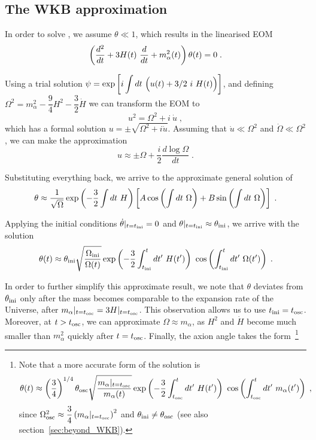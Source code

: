 \documentclass[11pt,a4paper]{article}
\begin{document}
\subsection{The WKB approximation}
%
In order to solve , we assume $\theta \ll 1$, which results in the linearised EOM
%
\begin{equation}
	\left( \dfrac{d^2}{d t} + 3 H(t) \ \dfrac{d}{d t} + m_{\alpha}^2(t)  \right) \theta(t) = 0 \; .
	\label{eq:linear_eom}
\end{equation}

Using a trial solution $\psi = \exp\left[  i \displaystyle \int d t \ \Big( u(t) +3/2 \ i \ H(t) \Big)  \right]$, and defining $\Omega^2 = m_{\alpha}^2 - \dfrac{9}{4} H^2 -  \dfrac{3}{2} \dot H $ we can transform the EOM to 
%
\begin{equation}
	u^2 = \Omega^2 + i \ \dot u \; ,
	\label{eq:eom_of_u}
\end{equation}
%
which has a formal solution $u = \pm \sqrt{\Omega^2 + i \dot u}$. Assuming that $\dot u \ll \Omega^2$ and $\dot \Omega \ll \Omega^2$, we can make the approximation
%
\begin{equation}
	u \approx \pm \Omega + \dfrac{i}{2} \dfrac{d \log \Omega}{d t} \;.
	\label{eq:u_approx}
\end{equation}


Substituting everything back, we arrive to the approximate general solution of  
%
\begin{equation}
	\theta \approx \dfrac{1}{\sqrt{\Omega}} \exp\left( -\dfrac{3}{2} \int d t \ H \right) \left[  A \cos\left(  \int d t \ \Omega \right) +  B \sin\left(  \int d t \ \Omega \right)     \right] \;. 
	\label{eq:general_solution_eom_approx}
\end{equation}

Applying the initial conditions $ \dot \theta |_{t=t_{\rm ini}{}} = 0$ and  $\theta|_{t=t_{\rm ini}{}} \approx \theta_{\rm ini}{}$, we arrive with the solution 
%
\begin{equation}
	\theta(t) \approx \theta_{\rm ini}{} \sqrt{ \dfrac{ \Omega_{\rm ini} }{\Omega (t)} } \exp\left( -\dfrac{3}{2} \int_{t_{\rm ini}{}}^t d t^\prime  \ H(t^\prime) \right) \  \cos\left(  \int_{t_{\rm ini}{}}^t d t^\prime  \ \Omega(t^\prime) \right)   \;.
	\label{eq:solution_eom_approx} 
\end{equation}


In order to further simplify this approximate result, we note that $\theta$ deviates from $\theta_{\rm ini}{}$ only after the mass becomes comparable to the expansion rate of the Universe, \ie after $m_{\alpha}|_{t = t_{\rm osc}{}} = 3 H|_{t = t_{\rm osc}{}}$. This observation allows us to use $t_{\rm ini}{} = t_{\rm osc}{}$.  Moreover, at $t> t_{\rm osc}{}$, we can approximate $\Omega \approx m_{\alpha}$, as $H^2$ and $\dot H$ become much smaller than $m_\alpha^2$ quickly after $t=t_{\rm osc}{}$. Finally, the axion angle takes the form~\footnote{Note that a more accurate form of the solution is 
	$$\theta(t) \approx \left( \dfrac{3}{4} \right)^{1/4} \theta_{\rm osc} \sqrt{ \dfrac{  m_\alpha{}|_{t=t_{\rm osc}{}}  }{m_\alpha{}  (t)} } \exp\left( -\dfrac{3}{2} \int_{t_{\rm osc}{}}^t d t^\prime  \ H(t^\prime) \right) \  \cos\left(  \int_{t_{\rm osc}{}}^t d t^\prime  \ m_\alpha{}(t^\prime) \right)\;,$$ since $\Omega_{\rm osc}^2 \approx \dfrac{3}{4} \left( m_\alpha{}|_{t = t_{\rm osc}{}} \right)^2$ and $\theta_{\rm ini}{} \neq \theta_{\rm osc}$ (see also section~\ref{sec:beyond_WKB}). 
}
\end{document}
